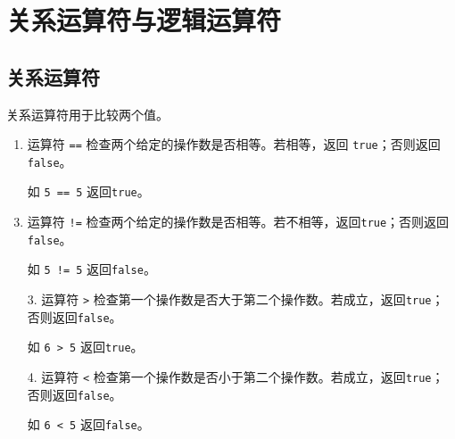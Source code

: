 \section{关系运算符与逻辑运算符}

\subsection{关系运算符}

\begin{frame}\ft{\subsecname}
关系运算符用于比较两个值。\\[.1in]
\begin{enumerate}
\item
  运算符 \lstinline|==|  检查两个给定的操作数是否相等。若相等，返回 \lstinline|true|；否则返回 \lstinline|false|。\\[.1in]
\item[] 如 \lstinline|5 == 5| 返回\lstinline|true|。\\[.1in]
\item
  运算符 \lstinline|!=|  检查两个给定的操作数是否相等。若不相等，返回\lstinline|true|；否则返回\lstinline|false|。\\[.1in]
\item[] 如 \lstinline|5 != 5| 返回\lstinline|false|。
\end{enumerate}
\end{frame}

\begin{frame}\ft{\subsecname}
  \begin{enumerate}
\item[3.]
  运算符 \lstinline|>| 检查第一个操作数是否大于第二个操作数。若成立，返回\lstinline|true|；否则返回\lstinline|false|。\\[.1in]
\item[] 如 \lstinline|6 > 5| 返回\lstinline|true|。\\[.1in]
\item[4.]
  运算符 \lstinline|<| 检查第一个操作数是否小于第二个操作数。若成立，返回\lstinline|true|；否则返回\lstinline|false|。\\[.1in]
\item[] 如 \lstinline|6 < 5| 返回\lstinline|false|。
\end{enumerate}
\end{frame}

